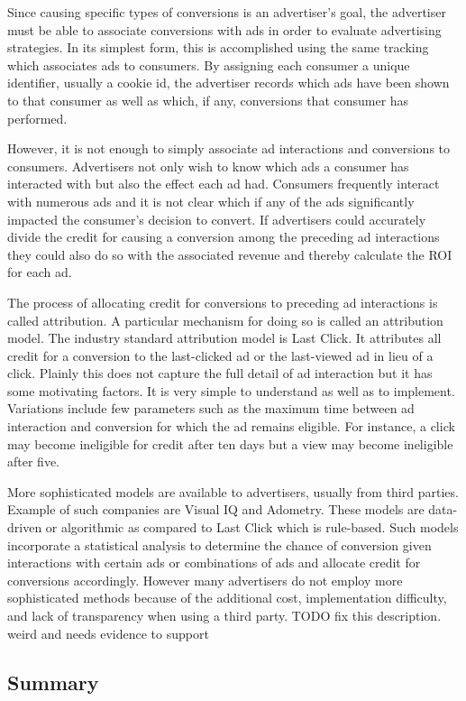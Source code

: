 \documentclass{article}
\begin{document}
Since causing specific types of conversions is an advertiser's goal, the advertiser must be able to associate conversions with ads in order to evaluate advertising strategies. In its simplest form, this is accomplished using the same tracking which associates ads to consumers. By assigning each consumer a unique identifier, usually a cookie id, the advertiser records which ads have been shown to that consumer as well as which, if any, conversions that consumer has performed.

However, it is not enough to simply associate ad interactions and conversions to consumers. Advertisers not only wish to know which ads a consumer has interacted with but also the effect each ad had. Consumers frequently interact with numerous ads and it is not clear which if any of the ads significantly impacted the consumer's decision to convert. If advertisers could accurately divide the credit for causing a conversion among the preceding ad interactions they could also do so with the associated revenue and thereby calculate the ROI for each ad.

The process of allocating credit for conversions to preceding ad interactions is called attribution. A particular mechanism for doing so is called an attribution model. The industry standard attribution model is Last Click. It attributes all credit for a conversion to the last-clicked ad or the last-viewed ad in lieu of a click. Plainly this does not capture the full detail of ad interaction but it has some motivating factors. It is very simple to understand as well as to implement. Variations include few parameters such as the maximum time between ad interaction and conversion for which the ad remains eligible. For instance, a click may become ineligible for credit after ten days but a view may become ineligible after five.

More sophisticated models are available to advertisers, usually from third parties. Example of such companies are Visual IQ and Adometry. These models are data-driven or algorithmic as compared to Last Click which is rule-based. Such models incorporate a statistical analysis to determine the chance of conversion given interactions with certain ads or combinations of ads and allocate credit for conversions accordingly. However many advertisers do not employ more sophisticated methods because of the additional cost, implementation difficulty, and lack of transparency when using a third party. TODO fix this description. weird and needs evidence to support

\subsection{Summary}
\end{document}
